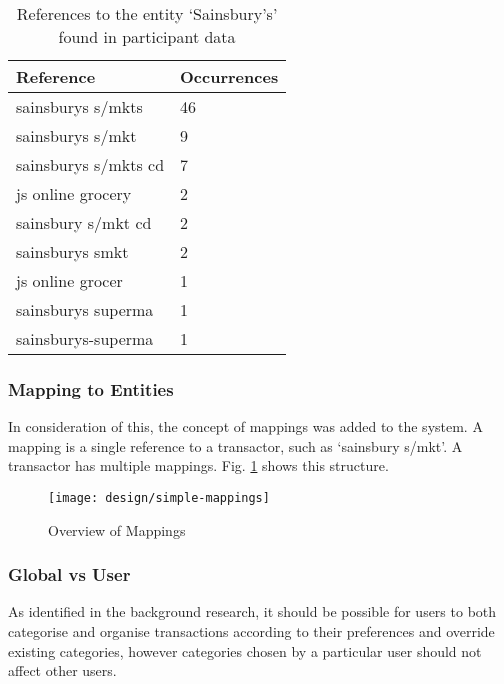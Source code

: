 \begin{table}[h]
\centering
\begin{tabular}{@{}ll@{}}
\toprule
Reference            & Occurrences \\ \midrule
sainsburys s/mkts    & 46          \\
sainsburys s/mkt     & 9           \\
sainsburys s/mkts cd & 7           \\
js online grocery    & 2           \\
sainsbury s/mkt cd   & 2           \\
sainsburys smkt      & 2           \\
js online grocer     & 1           \\
sainsburys superma   & 1           \\
sainsburys-superma   & 1           \\ \bottomrule
\end{tabular}
\caption{References to the entity `Sainsbury's' found in participant data}
\label{tab:sainsburys}
\end{table}

\subsubsection{Mapping to Entities}
In consideration of this, the concept of mappings was added to the system. A \gls{mapping} is a single \gls{reference} to a transactor, such as `sainsbury s/mkt'. A transactor has multiple mappings. Fig. \ref{fig:mapping} shows this structure.

\begin{figure}[h]
    \centering
    \texttt{[image: design/simple-mappings]}
    \caption{Overview of Mappings}
    \label{fig:mapping}
    
    \begin{comment}
[Transaction]<>*-[TransactorMapping]
[TransactorMapping]<>*-[Transactor]
    \end{comment}
\end{figure}


\subsubsection{Global vs User}
As identified in the background research, it should be possible for users to both categorise and organise transactions according to their preferences and override existing categories, however categories chosen by a particular user should not affect other users. 

